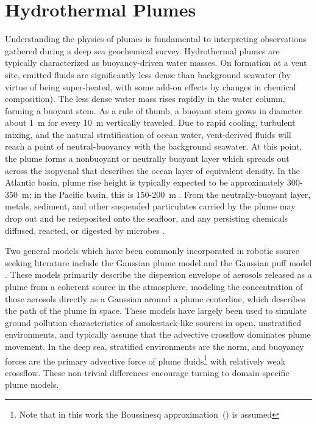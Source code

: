 \section{Hydrothermal Plumes}
\label{sec:rw_plumes}
Understanding the physics of plumes is fundamental to interpreting observations gathered during a deep sea geochemical survey. Hydrothermal plumes are typically characterized as buoyancy-driven water masses. On formation at a vent site, emitted fluids are significantly less dense than background seawater (by virtue of being super-heated, with some add-on effects by changes in chemical composition). The less dense water mass rises rapidly in the water column, forming a buoyant stem. As a rule of thumb, a buoyant stem grows in diameter about \SI{1}{\meter} for every \SI{10}{\meter} vertically traveled. Due to rapid cooling, turbulent mixing, and the natural stratification of ocean water, vent-derived fluids will reach a point of neutral-buoyancy with the background seawater. At this point, the plume forms a nonbuoyant or neutrally buoyant layer which spreads out across the isopycnal that describes the ocean layer of equivalent density. In the Atlantic basin, plume rise height is typically expected to be approximately 300-\SI{350}{\meter}; in the Pacific basin, this is 150-\SI{200}{\meter} \autocite{speer1989model}. From the neutrally-buoyant layer, metals, sediment, and other suspended particulates carried by the plume may drop out and be redeposited onto the seafloor, and any persisting chemicals diffused, reacted, or digested by microbes \autocite{scholz2019shelf,dick2013microbiology}.

Two general models which have been commonly incorporated in robotic source seeking literature include the Gaussian plume model \autocite{green1980analytic} and the Gaussian puff model \autocite{ludwig1977simplification}. These models primarily describe the dispersion envelope of aerosols released as a plume from a coherent source in the atmosphere, modeling the concentration of those aerosols directly as a Gaussian around a plume centerline, which describes the path of the plume in space. These models have largely been used to simulate ground pollution characteristics of smokestack-like sources in open, unstratified environments, and typically assume that the advective crossflow dominates plume movement. In the deep sea, stratified environments are the norm, and buoyancy forces are the primary advective force of plume fluids\footnote{Note that in this work the Boussinesq approximation~(\cite{van2010universal}) is assumed} with relatively weak crossflow. These non-trivial differences encourage turning to domain-specific plume models.

